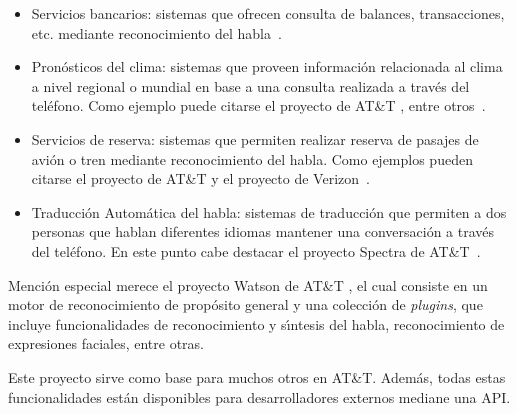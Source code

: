 \begin{itemize}
	\item Servicios bancarios: sistemas que ofrecen consulta de balances, transacciones, etc. mediante
	reconocimiento del \mbox{habla \cite{PreeEnhancing1999}}.

	\item Pron\'osticos del clima: sistemas que proveen informaci\'on relacionada al clima a nivel regional o mundial
	en base a una consulta realizada a trav\'es del tel\'efono. Como ejemplo puede citarse el proyecto 
	de AT\&T \cite{ZueJupiter2000}, entre \mbox{otros \cite{ZibertBiliengual2003}}.

	\item Servicios de reserva: sistemas que permiten realizar reserva de pasajes de avi\'on o tren mediante
	reconocimiento del habla. Como ejemplos pueden citarse el proyecto  de AT\&T \cite{Seneff2000Dialogue} 
	y el proyecto  de \mbox{Verizon \cite{StallardEvaluation2001}}.

	\item Traducci\'on Autom\'atica del habla: sistemas de traducci\'on que permiten a dos personas que hablan
	diferentes idiomas mantener una conversaci\'on a trav\'es del tel\'efono. En este punto cabe destacar el
	proyecto Spectra de \mbox{AT\&T \cite{Rangarajan2012}}.
\end{itemize}

Menci\'on especial merece el proyecto Watson de AT\&T \cite{AttWatson}, el cual consiste en un motor de reconocimiento de 
prop\'osito general y una colecci\'on de \emph{plugins}, que incluye funcionalidades de reconocimiento y s{\'\i}ntesis
del habla, reconocimiento de expresiones faciales, entre otras. 

Este proyecto sirve como base para muchos otros en AT\&T. Adem\'as, todas estas funcionalidades est\'an
disponibles para desarrolladores externos mediane una API. 